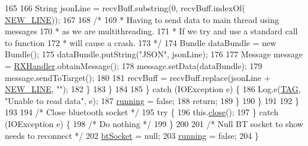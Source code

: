 \begin{DoxyCode}
165 
166                             String jsonLine = recvBuff.substring(0, recvBuff.indexOf(
      \hyperlink{class_android_app_1_1_b_t_connection_afe2f59edec0610e765222e02ab350e84}{NEW\_LINE}));
167 
168                             \textcolor{comment}{/*}
169 \textcolor{comment}{                             * Having to send data to main thread using messages}
170 \textcolor{comment}{                             * as we are multithreading.}
171 \textcolor{comment}{                             * If we try and use a standard call to function}
172 \textcolor{comment}{                             * will cause a crash.}
173 \textcolor{comment}{                             */}
174                             Bundle dataBundle =  \textcolor{keyword}{new} Bundle();
175                             dataBundle.putString(\textcolor{stringliteral}{"JSON"}, jsonLine);
176 
177                             Message message = \hyperlink{class_android_app_1_1_b_t_connection_a4e3bfea96a4ddbd2cd2b76bb4ce8b871}{RXHandler}.obtainMessage();
178                             message.setData(dataBundle);
179                             message.sendToTarget();
180 
181                             recvBuff = recvBuff.replace(jsonLine + \hyperlink{class_android_app_1_1_b_t_connection_afe2f59edec0610e765222e02ab350e84}{NEW\_LINE}, \textcolor{stringliteral}{""});
182                         \}
183                     \}
184 
185                 \} \textcolor{keywordflow}{catch} (IOException e) \{
186                     Log.e(\hyperlink{class_android_app_1_1_b_t_connection_ad838024d59c68be866b5db329d6f6230}{TAG}, \textcolor{stringliteral}{"Unable to read data"}, e);
187                     \hyperlink{class_android_app_1_1_b_t_connection_ace01a7a97f5d1abccb61a5d6c6ad9295}{running} = \textcolor{keyword}{false};
188                     \textcolor{keywordflow}{return};
189                 \}
190             \}
191 
192         \}
193 
194         \textcolor{comment}{/* Close bluetooth socket */}
195         \textcolor{keywordflow}{try} \{
196             this.\hyperlink{class_android_app_1_1_b_t_connection_a37bb3e5c1dcf6b78a73239f6f62ab6d8}{close}();
197         \} \textcolor{keywordflow}{catch} (IOException e) \{
198             \textcolor{comment}{/* Do nothing */}
199         \}
200 
201         \textcolor{comment}{/* Null BT socket to show needs to reconnect */}
202         \hyperlink{class_android_app_1_1_b_t_connection_af3cdc6c880b28361d87d0118ace0e49c}{btSocket} = null;
203         \hyperlink{class_android_app_1_1_b_t_connection_ace01a7a97f5d1abccb61a5d6c6ad9295}{running} = \textcolor{keyword}{false};
204     \}
\end{DoxyCode}
\mbox{\label{class_android_app_1_1_b_t_connection_a88abb39350aef278f15e54be4d0d1df3}} 
